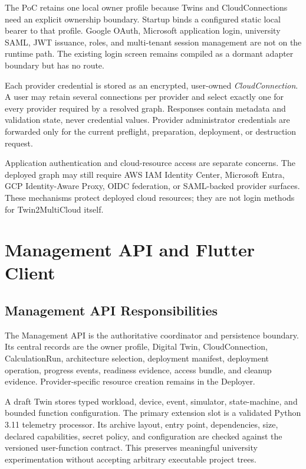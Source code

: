 The PoC retains one local owner profile because Twins and CloudConnections
need an explicit ownership boundary. Startup binds a configured static local
bearer to that profile. Google OAuth, Microsoft application login, university
SAML, JWT issuance, roles, and multi-tenant session management are not on the
runtime path. The existing login screen remains compiled as a dormant adapter
boundary but has no route.

Each provider credential is stored as an encrypted, user-owned
\emph{CloudConnection}. A user may retain several connections per provider and
select exactly one for every provider required by a resolved graph. Responses
contain metadata and validation state, never credential values. Provider
administrator credentials are forwarded only for the current preflight,
preparation, deployment, or destruction request.

Application authentication and cloud-resource access are separate concerns.
The deployed graph may still require AWS IAM Identity Center, Microsoft Entra,
GCP Identity-Aware Proxy, OIDC federation, or SAML-backed provider surfaces.
These mechanisms protect deployed cloud resources; they are not login methods
for Twin2MultiCloud itself.

\section{Management API and Flutter Client}
\label{sec:orchestrator}

\subsection{Management API Responsibilities}
\label{sec:management-api}

The Management API is the authoritative coordinator and persistence boundary.
Its central records are the owner profile, Digital Twin, CloudConnection,
CalculationRun, architecture selection, deployment manifest, deployment
operation, progress events, readiness evidence, access bundle, and cleanup
evidence. Provider-specific resource creation remains in the Deployer.

A draft Twin stores typed workload, device, event, simulator, state-machine,
and bounded function configuration. The primary extension slot is a validated
Python 3.11 telemetry processor. Its archive layout, entry point, dependencies,
size, declared capabilities, secret policy, and configuration are checked
against the versioned user-function contract. This preserves meaningful
university experimentation without accepting arbitrary executable project
trees.

